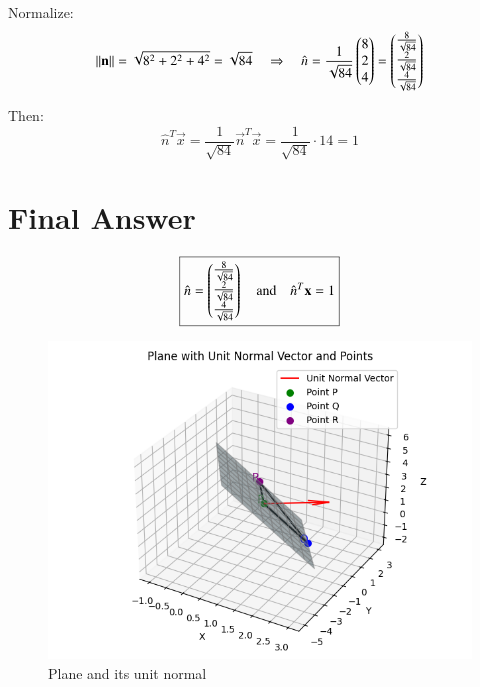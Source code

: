 \documentclass[journal]{IEEEtran}
\begin{document}
Normalize:
\[
\|\mathbf{n}\| = \sqrt{8^2 + 2^2 + 4^2} = \sqrt{84}
\quad \Rightarrow \quad
\hat{n} = \frac{1}{\sqrt{84}} \begin{pmatrix}8 \\ 2 \\ 4\end{pmatrix}
= \begin{pmatrix}\frac{8}{\sqrt{84}} \\ \frac{2}{\sqrt{84}} \\ \frac{4}{\sqrt{84}}\end{pmatrix}
\]

Then:
\[
\hat{n}^T \vec{x} = \frac{1}{\sqrt{84}} \vec{n}^T \vec{x}
= \frac{1}{\sqrt{84}} \cdot 14 = 1
\]

\section*{\large\textbf{Final Answer}}

\[
\boxed{
\hat{n} = \begin{pmatrix}\frac{8}{\sqrt{84}} \\
\frac{2}{\sqrt{84}} \\
\frac{4}{\sqrt{84}}\end{pmatrix}
\quad \text{and} \quad
\hat{n}^T \mathbf{x} = 1
}
\]

\begin{figure}[H]
\centering
\includegraphics[width=0.8\linewidth]{Figs/fig1.png}
\caption{Plane and its unit normal}
\end{figure}
\end{document}
